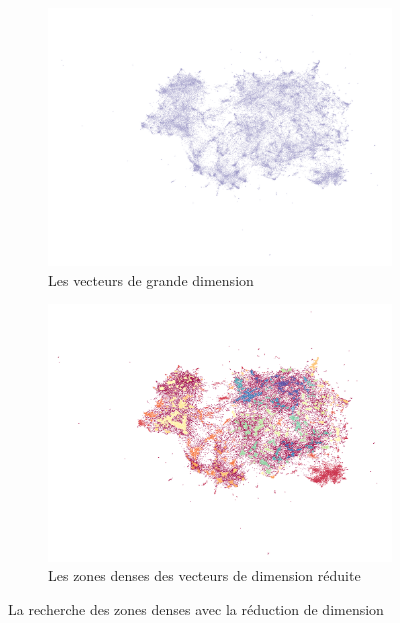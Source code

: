 \begin{figure}
     \centering
     \begin{subfigure}[b]{0.9\textwidth}
         \centering
         \includegraphics[width=\textwidth]{img/sparse.png}
         \caption{Les vecteurs de grande dimension}
     \end{subfigure}
     \hfill
     \begin{subfigure}[b]{0.9\textwidth}
         \centering
         \includegraphics[width=\textwidth]{img/dense.png}
         \caption{Les zones denses des vecteurs de dimension réduite}
     \end{subfigure}
     \hfill
        \caption{La recherche des zones denses avec la réduction de dimension}
    \label{fig:step2_top2vec}
\end{figure}


